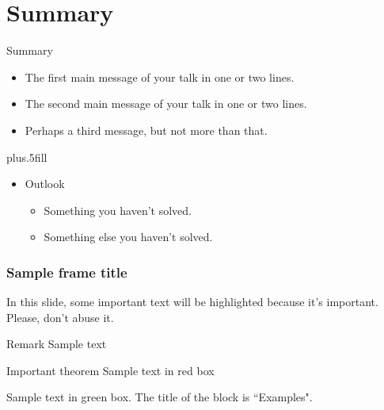 \documentclass{beamer}
\begin{document}
\section*{Summary}

\begin{frame}{Summary}
  \begin{itemize}
  \item
    The \alert{first main message} of your talk in one or two lines.
  \item
    The \alert{second main message} of your talk in one or two lines.
  \item
    Perhaps a \alert{third message}, but not more than that.
  \end{itemize}
  \vskip0pt plus.5fill
  \begin{itemize}
  \item
    Outlook
    \begin{itemize}
    \item
      Something you haven't solved.
    \item
      Something else you haven't solved.
    \end{itemize}
  \end{itemize}
\end{frame}

\begin{frame}
\frametitle{Sample frame title}

In this slide, some important text will be
\alert{highlighted} because it's important.
Please, don't abuse it.

\begin{block}{Remark}
Sample text
\end{block}

\begin{alertblock}{Important theorem}
Sample text in red box
\end{alertblock}

\begin{examples}
Sample text in green box. The title of the block is ``Examples".
\end{examples}
\end{frame}
\end{document}
